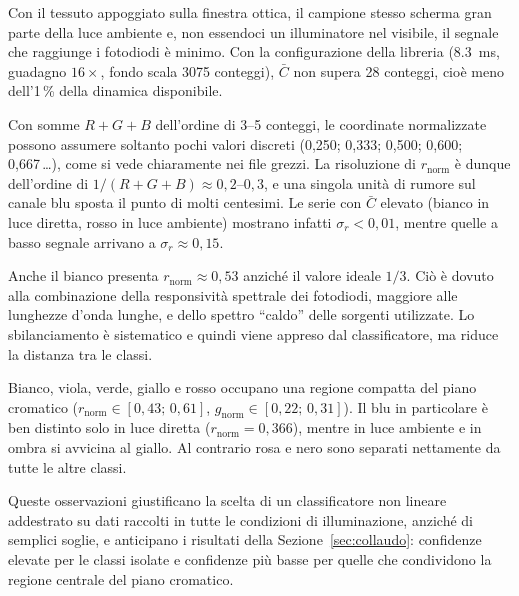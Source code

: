 \documentclass[11pt,a4paper,twoside,openany]{report}
\newenvironment{toollist}{%
  \begin{description}[
    style=nextline,
    leftmargin=0pt,
    labelindent=0pt,
    font=\normalfont\bfseries,
    itemsep=6pt
  ]
}{%
  \end{description}
}
\newcommand{\rn}{r_{\mathrm{norm}}}
\newcommand{\gn}{g_{\mathrm{norm}}}
\begin{document}
\begin{toollist}
  \item[Conteggi molto bassi]
        Con il tessuto appoggiato sulla finestra ottica, il campione
        stesso scherma gran parte della luce ambiente e, non essendoci
        un illuminatore nel visibile, il segnale che raggiunge i
        fotodiodi è minimo. Con la configurazione della libreria
        (\SI{8.3}{ms}, guadagno $16\times$, fondo scala 3075 conteggi),
        $\bar{C}$ non supera 28 conteggi, cioè meno dell'1\,\% della
        dinamica disponibile.
  \item[Quantizzazione delle feature]
        Con somme $R+G+B$ dell'ordine di 3--5 conteggi, le coordinate
        normalizzate possono assumere soltanto pochi valori discreti
        (0,250; 0,333; 0,500; 0,600; 0,667\,\dots), come si vede
        chiaramente nei file grezzi. La risoluzione di $\rn$ è dunque
        dell'ordine di $1/(R+G+B) \approx 0{,}2$--$0{,}3$, e una singola
        unità di rumore sul canale blu sposta il punto di molti
        centesimi. Le serie con $\bar{C}$ elevato (bianco in luce
        diretta, rosso in luce ambiente) mostrano infatti $\sigma_r <
        0{,}01$, mentre quelle a basso segnale arrivano a
        $\sigma_r \approx 0{,}15$.
  \item[Sbilanciamento verso il rosso]
        Anche il bianco presenta $\rn \approx 0{,}53$ anziché il valore
        ideale $1/3$. Ciò è dovuto alla combinazione della
        responsività spettrale dei fotodiodi, maggiore alle lunghezze
        d'onda lunghe, e dello spettro \enquote{caldo} delle sorgenti
        utilizzate. Lo sbilanciamento è sistematico e quindi viene
        appreso dal classificatore, ma riduce la distanza tra le classi.
  \item[Classi sovrapposte]
        Bianco, viola, verde, giallo e rosso occupano una regione
        compatta del piano cromatico ($\rn \in [0{,}43;\,0{,}61]$,
        $\gn \in [0{,}22;\,0{,}31]$). Il blu in particolare è ben
        distinto solo in luce diretta ($\rn = 0{,}366$), mentre in luce
        ambiente e in ombra si avvicina al giallo. Al contrario rosa e
        nero sono separati nettamente da tutte le altre classi.
\end{toollist}

Queste osservazioni giustificano la scelta di un classificatore non
lineare addestrato su dati raccolti in tutte le condizioni di
illuminazione, anziché di semplici soglie, e anticipano i risultati
della Sezione~\ref{sec:collaudo}: confidenze elevate per le classi
isolate e confidenze più basse per quelle che condividono la regione
centrale del piano cromatico.
\end{document}
